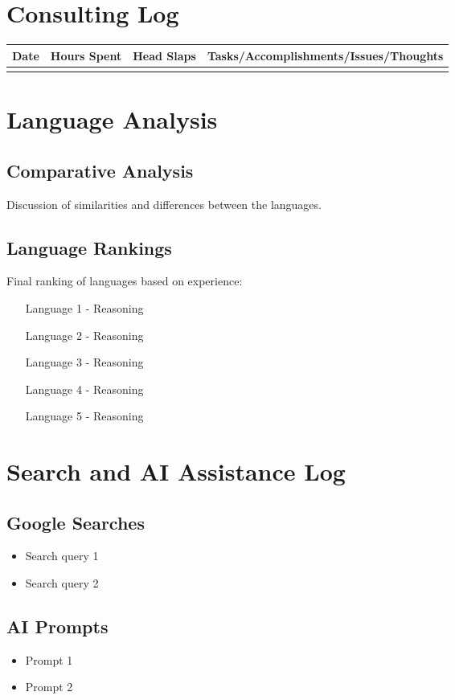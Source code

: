 \documentclass[12pt]{article}
\begin{document}
\section{Consulting Log}
\begin{tabularx}{\textwidth}{|X|X|X|X|}
\hline
\textbf{Date} & \textbf{Hours Spent} & \textbf{Head Slaps} & \textbf{Tasks/Accomplishments/Issues/Thoughts} \\
\hline
& & & \\
\hline
\end{tabularx}

\section{Language Analysis}
\subsection{Comparative Analysis}
Discussion of similarities and differences between the languages.

\subsection{Language Rankings}
Final ranking of languages based on experience:
\begin{enumerate}
\item [Language 1] - Reasoning
\item [Language 2] - Reasoning
\item [Language 3] - Reasoning
\item [Language 4] - Reasoning
\item [Language 5] - Reasoning
\end{enumerate}

\section{Search and AI Assistance Log}
\subsection{Google Searches}
\begin{itemize}
\item Search query 1
\item Search query 2
\end{itemize}

\subsection{AI Prompts}
\begin{itemize}
\item Prompt 1
\item Prompt 2
\end{itemize}
\end{document}
